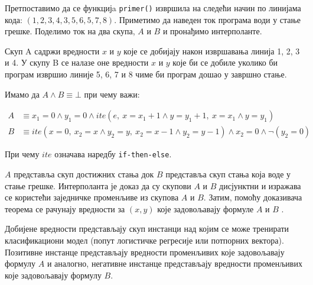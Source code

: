 \documentclass[a4paper]{article}
\begin{document}
{%

Претпоставимо да се функцијa \texttt{primer()} извршила на следећи начин по линијама кода: $(1, 2, 3, 4, 3, 5, 6, 5, 7, 8)$. Приметимо
да наведен ток програма води у стање грешке. Поделимо ток на два скупа, $A$ и $B$ и пронађимо интерполанте.

Скуп A садржи вредности $x$ и $y$ које се добијају након извршавања линија 1, 2, 3 и 4. У скупу B се налазе оне вредности $x$ и $y$
које би се добиле уколико би програм извршио линије 5, 6, 7 и 8 чиме би програм дошао у завршно стање.

Имамо да $A \land B \equiv \bot$ при чему важи:

\begin{equation*}
\begin{split}
    A & \equiv x_1 = 0 \land y_1 = 0 \land ite(e,\ x = x_1 + 1 \land y = y_1 + 1, \ x = x_1 \land y = y_1)     \\
    B & \equiv ite(x = 0,\ x_2 = x \land y_2 = y,\ x_2 = x - 1 \land y_2 = y-1) \land x_2 = 0 \land \neg (y_2 = 0)
\end{split}
\end{equation*}

При чему $ite$ означава наредбу \texttt{if-then-else}.

$A$ представља скуп достижних стања док $B$ представља скуп стања која воде у стање грешке. Интерполанта је доказ да су
скупови $A$ и $B$ дисјунктни и изражава се користећи заједничке променљиве из скупова $A$ и $B$. Затим, помоћу доказивача теорема се рачунају вредности за $(x, y)$ које задовољавају формуле $A$ и $B$ \cite{Sharma_interpolantsas}.

Добијене вредности представљају скуп инстанци над којим се може тренирати класификациони модел (попут логистичке регресије или потпорних вектора).
Позитивне инстанце представљају вредности променљивих које задовољавају формулу $A$ и аналогно, негативне инстанце представљају вредности
променљивих које задовољавају формулу $B$.

}
\end{document}
